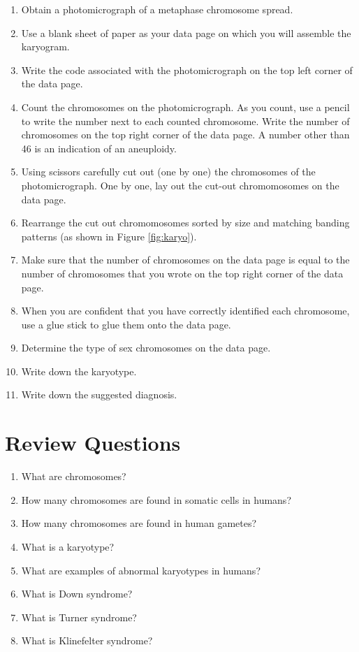 \documentclass[]{book}
\providecommand{\tightlist}{%
  \setlength{\itemsep}{0pt}\setlength{\parskip}{0pt}}
\begin{document}
\begin{enumerate}
\def\labelenumi{\arabic{enumi}.}
\tightlist
\item
  Obtain a photomicrograph of a metaphase chromosome spread.
\item
  Use a blank sheet of paper as your data page on which you will assemble the karyogram.
\item
  Write the code associated with the photomicrograph on the top left corner of the data page.
\item
  Count the chromosomes on the photomicrograph. As you count, use a pencil to write the number next to each counted chromosome. Write the number of chromosomes on the top right corner of the data page. A number other than 46 is an indication of an aneuploidy.
\item
  Using scissors carefully cut out (one by one) the chromosomes of the photomicrograph. One by one, lay out the cut-out chromomosomes on the data page.
\item
  Rearrange the cut out chromomosomes sorted by size and matching banding patterns (as shown in Figure \ref{fig:karyo}).
\item
  Make sure that the number of chromosomes on the data page is equal to the number of chromosomes that you wrote on the top right corner of the data page.
\item
  When you are confident that you have correctly identified each chromosome, use a glue stick to glue them onto the data page.
\item
  Determine the type of sex chromosomes on the data page.
\item
  Write down the karyotype.
\item
  Write down the suggested diagnosis.
\end{enumerate}

\hypertarget{review-questions-2}{%
\section{Review Questions}\label{review-questions-2}}

\begin{enumerate}
\def\labelenumi{\arabic{enumi}.}
\tightlist
\item
  What are chromosomes?
\item
  How many chromosomes are found in somatic cells in humans?
\item
  How many chromosomes are found in human gametes?
\item
  What is a karyotype?
\item
  What are examples of abnormal karyotypes in humans?
\item
  What is Down syndrome?
\item
  What is Turner syndrome?
\item
  What is Klinefelter syndrome?
\end{enumerate}
\end{document}
